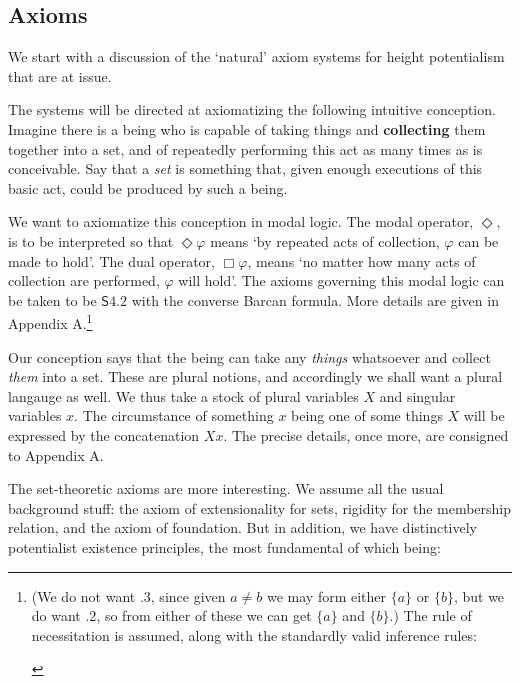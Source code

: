 \documentclass{article}
\begin{document}
\subsection{Axioms}
We start with a discussion of the `natural' axiom systems for height potentialism 
that are at issue.

The systems will be directed at axiomatizing the following 
intuitive conception. Imagine there is a being who is capable of taking things 
and {\bf collecting} them together into a set, and of repeatedly performing this act 
as many times as is conceivable. Say that a \emph{set} is something that, given enough 
executions of this basic act, could be produced by such a being. 

We want to axiomatize this conception in modal logic. The modal operator, $\Diamond$, 
is to be interpreted so that $\Diamond \varphi$ means
`by repeated acts of collection, $\varphi$ can be made to hold'. The dual 
operator, $\Box \varphi$, means `no matter how many acts of collection are performed, 
$\varphi$ will hold'. The axioms governing this modal logic can be taken to be 
$\mathsf{S4.2}$ with the converse Barcan formula. More details are given in Appendix A.\footnote{(We do not want $.3$, 
since given $a \not= b$ we may form either $\{a\}$ or $\{b\}$, but we do want 
$.2$,
so from either of these we can get $\{a\}$ and $\{b\}$.) The rule of necessitation 
is assumed, along with the standardly valid inference rules:
\begin{prooftree}
\end{prooftree}}
 
Our conception says that the being can take any \emph{things} whatsoever and collect 
\emph{them} into a set. These are plural notions, and accordingly we shall want a plural 
langauge as well. We thus take a stock of plural variables $X$ and singular variables $x$.
The circumstance of something $x$ being one of some things $X$ will be expressed by 
the concatenation $Xx$. The precise details, once more,  are consigned to Appendix A. 

The set-theoretic axioms are more interesting. We assume all the usual 
background stuff: the axiom of extensionality for sets, rigidity for the 
membership relation, and the axiom of foundation. But in addition, we have 
distinctively potentialist existence principles, the most fundamental of which 
being:
\end{document}
